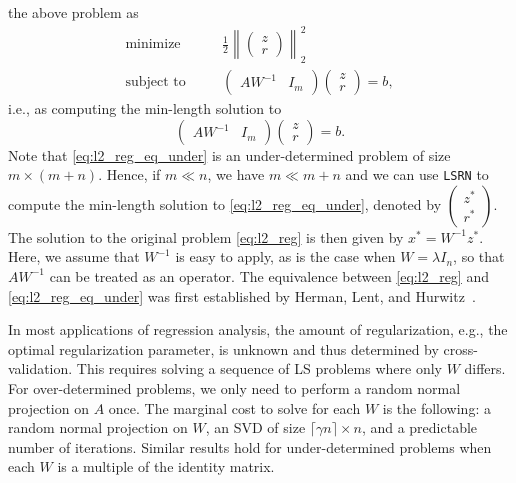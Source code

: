 \documentclass{siamltex}
\begin{document}
the above problem as
\begin{eqnarray*}
  \text{minimize} &\quad& \frac{1}{2} \left\|
  \begin{pmatrix}
    z \\ r
  \end{pmatrix}
\right\|_2^2 \\
\text{subject to} &\quad& 
  \begin{pmatrix}
    A W^{-1} & I_m
  \end{pmatrix}
  \begin{pmatrix}
    z \\ r
  \end{pmatrix}
  =
  b,
\end{eqnarray*}
i.e., as computing the min-length solution to
\begin{equation}
  \label{eq:l2_reg_eq_under}
  \begin{pmatrix}
    A W^{-1} & I_m
  \end{pmatrix}
  \begin{pmatrix}
    z \\ r
  \end{pmatrix}
  =
  b.
\end{equation}
Note that \eqref{eq:l2_reg_eq_under} is an under-determined problem of size $m
\times (m+n)$. Hence, if $m \ll n$, we have $m \ll m+n$ and we can use
\texttt{LSRN} to compute the min-length solution to \eqref{eq:l2_reg_eq_under},
denoted by {\scriptsize $\begin{pmatrix} z^* \\ r^* \end{pmatrix}$}.  The solution to the
original problem \eqref{eq:l2_reg} is then given by $x^* = W^{-1} z^*$.  Here,
we assume that $W^{-1}$ is easy to apply, as is the case when $W=\lambda I_n$,
so that $A W^{-1}$ can be treated as an operator.
The equivalence between \eqref{eq:l2_reg} and \eqref{eq:l2_reg_eq_under} was 
first established by Herman, Lent, and Hurwitz~\cite{herman1980storage}. 


In most applications of regression analysis, the amount of regularization, e.g.,
the optimal regularization parameter, is unknown and thus determined by
cross-validation.  This requires solving a sequence of LS problems where only
$W$ differs.  For over-determined problems, we only need to perform a random
normal projection on $A$ once.  The marginal cost to solve for each $W$ is the
following: a random normal projection on $W$, an SVD of size $\lceil \gamma n
\rceil \times n$, and a predictable number of iterations.  Similar results hold
for under-determined problems when each $W$ is a multiple of the identity
matrix.
\end{document}
